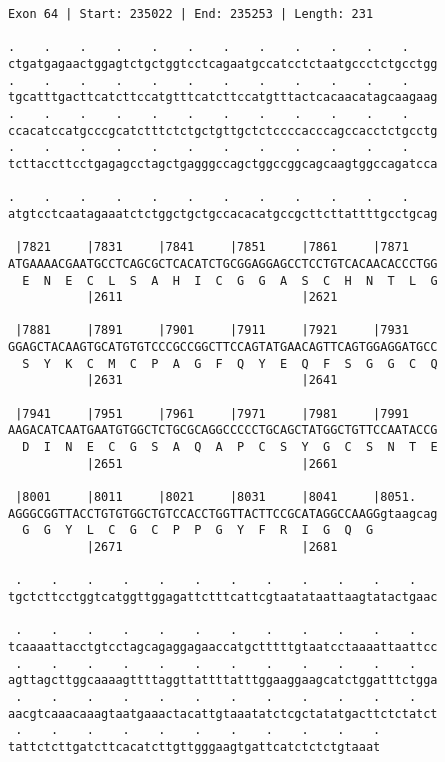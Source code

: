 \documentclass{article}
\begin{document}
\begin{Verbatim}
Exon 64 | Start: 235022 | End: 235253 | Length: 231
 
.    .    .    .    .    .    .    .    .    .    .    .    
ctgatgagaactggagtctgctggtcctcagaatgccatcctctaatgccctctgcctgg
.    .    .    .    .    .    .    .    .    .    .    .    
tgcatttgacttcatcttccatgtttcatcttccatgtttactcacaacatagcaagaag
.    .    .    .    .    .    .    .    .    .    .    .    
ccacatccatgcccgcatctttctctgctgttgctctccccacccagccacctctgcctg
.    .    .    .    .    .    .    .    .    .    .    .    
tcttaccttcctgagagcctagctgagggccagctggccggcagcaagtggccagatcca
  
.    .    .    .    .    .    .    .    .    .    .    .    
atgtcctcaatagaaatctctggctgctgccacacatgccgcttcttattttgcctgcag
  
 |7821     |7831     |7841     |7851     |7861     |7871    
ATGAAAACGAATGCCTCAGCGCTCACATCTGCGGAGGAGCCTCCTGTCACAACACCCTGG
  E  N  E  C  L  S  A  H  I  C  G  G  A  S  C  H  N  T  L  G
           |2611                         |2621              
  
 |7881     |7891     |7901     |7911     |7921     |7931    
GGAGCTACAAGTGCATGTGTCCCGCCGGCTTCCAGTATGAACAGTTCAGTGGAGGATGCC
  S  Y  K  C  M  C  P  A  G  F  Q  Y  E  Q  F  S  G  G  C  Q
           |2631                         |2641              
  
 |7941     |7951     |7961     |7971     |7981     |7991    
AAGACATCAATGAATGTGGCTCTGCGCAGGCCCCCTGCAGCTATGGCTGTTCCAATACCG
  D  I  N  E  C  G  S  A  Q  A  P  C  S  Y  G  C  S  N  T  E
           |2651                         |2661              
  
 |8001     |8011     |8021     |8031     |8041     |8051.   
AGGGCGGTTACCTGTGTGGCTGTCCACCTGGTTACTTCCGCATAGGCCAAGGgtaagcag
  G  G  Y  L  C  G  C  P  P  G  Y  F  R  I  G  Q  G         
           |2671                         |2681              
  
 .    .    .    .    .    .    .    .    .    .    .    .   
tgctcttcctggtcatggttggagattctttcattcgtaatataattaagtatactgaac
  
 .    .    .    .    .    .    .    .    .    .    .    .   
tcaaaattacctgtcctagcagaggagaaccatgctttttgtaatcctaaaattaattcc
 .    .    .    .    .    .    .    .    .    .    .    .   
agttagcttggcaaaagttttaggttattttatttggaaggaagcatctggatttctgga
 .    .    .    .    .    .    .    .    .    .    .    .   
aacgtcaaacaaagtaatgaaactacattgtaaatatctcgctatatgacttctctatct
 .    .    .    .    .    .    .    .    .    .    .
tattctcttgatcttcacatcttgttgggaagtgattcatctctctgtaaat
\end{Verbatim}
\end{document}
